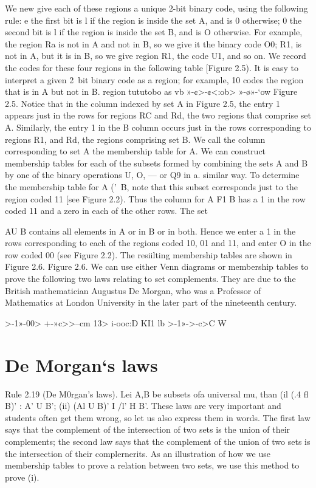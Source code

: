 {{%

We new give each of these regions a unique 2-bit binary code, using the following rule:
e the ﬁrst bit is l if the region is inside the set A, and is 0 otherwise;
0 the second bit is l if the region is inside the set B, and is O otherwise.
For example, the region Ra is not in A and not in B, so we give it the binary code O0; R1, is not
in A, but it is in B, so we give region R1, the code U1, and so on. We record the codes for these
four regions in the following table [Figure 2.5). It is easy to interpret a given 2~bit binary code as
a region; for example, 10 codes the region that is in A but not in B.
region
tututobo
as vb
»-¢>-¢<:ob>
»-\o»-‘ow
Figure 2.5.
Notice that in the column indexed by set A in Figure 2.5, the entry 1 appears just in the rows for
regions RC and Rd, the two regions that comprise set A. Similarly, the entry 1 in the B column
occurs just in the rows corresponding to regions R1, and Rd, the regions comprising set B. We call
the column corresponding to set A the membership table for A.
We can construct membership tables for each of the subsets formed by combining the sets A and B
by one of the binary operations U, O, — or Q9 in a. similar way. To determine the membership table
for A ('\ B, note that this subset corresponds just to the region coded 11 [see Figure 2.2). Thus
the column for A F1 B has a 1 in the row coded 11 and a zero in each of the other rows. The set

AU B contains all elements in A or in B or in both. Hence we enter a 1 in the rows corresponding
to each of the regions coded 10, 01 and 11, and enter O in the row coded 00 (see Figure 2.2). The
resiilting membership tables are shown in Figure 2.6.
Figure 2.6.
We can use either Venn diagrams or membership tables to prove the following two laws relating
to set complements. They are due to the British mathematician Augustus De Morgan, who was a
Professor of Mathematics at London University in the later part of the nineteenth century.

>-1»-00>
+-»c>>--cm
13>
i-ooc:D
KI1
lb
>-1»->-c>C
W
\section{De Morgan‘s laws}
Rule 2.19 (De M0rgan’s laws). Lei A,B be subsets ofa universal mu, than
(il (.4 fl B)’ : A’ U B’;
(ii) (Al U B)’ I /l’ H B’.
These laws are very important and students often get them wrong, so let us also express them in
words. The ﬁrst law says that the complement of the intersection of two sets is the union of their
complements; the second law says that the complement of the union of two sets is the intersection
of their complernerits.
As an illustration of how we use membership tables to prove a relation between two sets, we use
this method to prove (i).

}}
